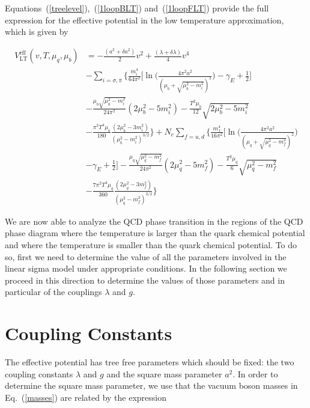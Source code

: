 \documentclass[%
 reprint,
showpacs,preprintnumbers,
 amsmath,amssymb,
onecolumn]{revtex4}
\begin{document}
Equations~(\ref{treelevel}),~(\ref{1loopBLT}) and~(\ref{1loopFLT}) provide the full expression for the effective potential in the low temperature approximation, which is given by

\begin{align}
    V_{\text{LT}}^{\text{eff}}(v,T,\mu_q,\mu_b)&=-\frac{(a^2+\delta a^2)}{2}v^2
    +\frac{(\lambda+\delta \lambda)}{4}v^4 \nonumber \\
    &-\sum_{i=\sigma,\bar{\pi}}\Big \{ \frac{m_i^4}{64\pi^2}\Big[ \ln \Big( \frac{4\pi^2 a^2}{(\mu_b+\sqrt{\mu_b^2-m_i^2})^2}\Big) -\gamma_E+\frac{1}{2}  \Big]\nonumber\\
    &-\frac{\mu_b\sqrt{\mu_b^2-m_i^2}}{24\pi^2}(2\mu_b^2-5m_i^2) -\frac{T^2\mu_b}{12}\sqrt{2\mu_b^2-5m_i^2}\nonumber \\
    &-\frac{\pi^2T^4\mu_b}{180}\frac{(2\mu_b^2-3m_i^2)}{(\mu_b^2-m_i^2)^{3/2}} \Big\}+N_c\sum_{f=u,d}\Big\{ \frac{m_f^4}{16\pi^2}\Big[ \ln \Big( \frac{4\pi^2 a^2}{(\mu_q+\sqrt{\mu_q^2-m_f^2})^2}\Big)\nonumber \\
    &-\gamma_E+\frac{1}{2}  \Big]-\frac{\mu_q\sqrt{\mu_q^2-m_f^2}}{24\pi^2}(2\mu_q^2-5m_f^2) -\frac{T^2\mu_q}{6}\sqrt{\mu_q^2-m_f^2}\nonumber \\
    &-\frac{7\pi^2T^4\mu_q}{360}\frac{(2\mu_q^2-3m_f^2)}{(\mu_q^2-m_f^2)^{3/2}} \Big\} 
    \label{VeffLT}
\end{align}



We are now able to analyze the QCD phase transition in the regions of the QCD phase diagram where the temperature is larger than the quark chemical potential and where the temperature is smaller than the quark chemical potential. To do so, first we need to determine the value of all the parameters involved in the linear sigma model under appropriate conditions. In the following section we proceed in this direction to determine the values of those parameters and in particular of the couplings $\lambda$ and $g$.

\section{\label{sec:level7}Coupling Constants}

The effective potential has tree free parameters which should be fixed: the two coupling constants $\lambda$ and $g$ and the square mass parameter $a^2$. In order to determine the square mass parameter, we use that the vacuum boson masses in Eq.~(\ref{masses}) are related by the expression
\end{document}
